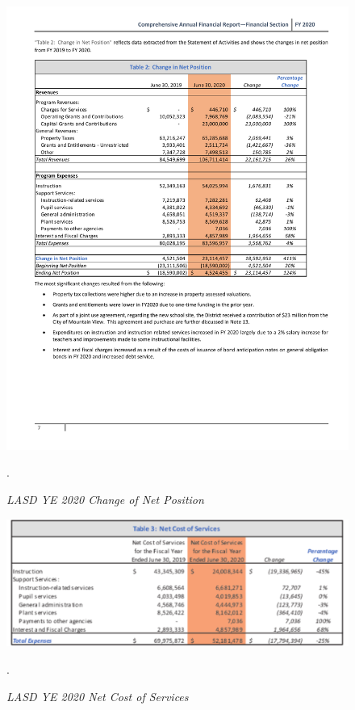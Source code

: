 \begin{figure}
  \centering
  \caption[LASD YE 2020 Change of Net Position]{\textit{LASD YE 2020 Change of Net Position}}\label{fig:Change_Position}
  \includegraphics[width=\textwidth]{CAFR-YE2020_Change_in_Net_Position}\\
  \footnotesize\raggedright\textcite[7]{Kenyon2021}.
\end{figure}

\begin{figure}
  \centering
  \caption[LASD YE 2020 Net Cost of Services]{\textit{LASD YE 2020 Net Cost of Services}}%
  \label{fig:Cost_Services}
  \includegraphics[width=\textwidth]{CAFR-YE2020_Net_Cost_of_Services}\\
  \footnotesize\raggedright\textcite[9]{Kenyon2021}.
\end{figure}

